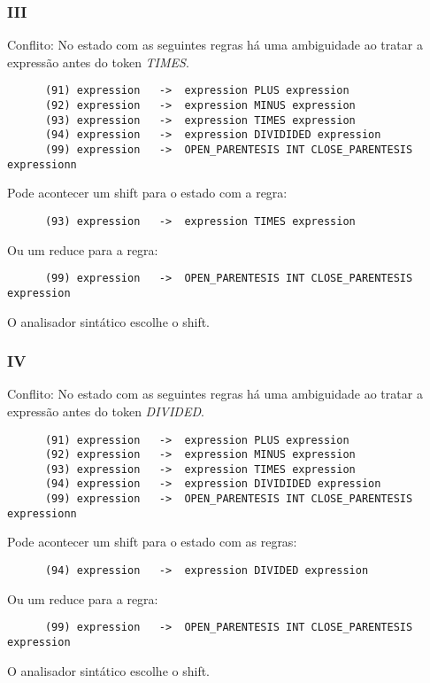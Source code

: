 \documentclass[a4paper,10pt]{article}
\begin{document}
    \subsubsection{III}
      Conflito: No estado com as seguintes regras h\'a uma ambiguidade ao tratar a express\~ao antes do token \emph{TIMES}.
      \begin{lstlisting}
      (91) expression	->	expression PLUS expression
      (92) expression	->	expression MINUS expression
      (93) expression	->	expression TIMES expression
      (94) expression	->	expression DIVIDIDED expression
      (99) expression	->	OPEN_PARENTESIS INT CLOSE_PARENTESIS expressionn
      \end{lstlisting}
      Pode acontecer um shift para o estado com a regra:
      \begin{lstlisting}
      (93) expression	->	expression TIMES expression
      \end{lstlisting}
      Ou um reduce para a regra:
      \begin{lstlisting}
      (99) expression	->	OPEN_PARENTESIS INT CLOSE_PARENTESIS expression
      \end{lstlisting}
      O analisador sint\'atico escolhe o shift.
      \vspace{5mm}
      
    \subsubsection{IV}
      Conflito: No estado com as seguintes regras h\'a uma ambiguidade ao tratar a express\~ao antes do token \emph{DIVIDED}.
      \begin{lstlisting}
      (91) expression	->	expression PLUS expression
      (92) expression	->	expression MINUS expression
      (93) expression	->	expression TIMES expression
      (94) expression	->	expression DIVIDIDED expression
      (99) expression	->	OPEN_PARENTESIS INT CLOSE_PARENTESIS expressionn
      \end{lstlisting}
      Pode acontecer um shift para o estado com as regras:
      \begin{lstlisting}
      (94) expression	->	expression DIVIDED expression
      \end{lstlisting}
      Ou um reduce para a regra:
      \begin{lstlisting}
      (99) expression	->	OPEN_PARENTESIS INT CLOSE_PARENTESIS expression
      \end{lstlisting}
      O analisador sint\'atico escolhe o shift.
      \vspace{5mm}
\end{document}
